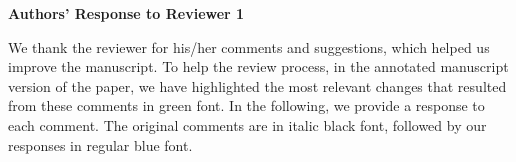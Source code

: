 \documentclass{article}
\begin{document}

\begin{center}
	\bf
	\large
	Authors' Response to Reviewer 1
\end{center}

\noindent
We thank the reviewer for his/her comments and suggestions, which helped us improve the manuscript. To help the review process, in the annotated manuscript version of the paper, we have highlighted the most relevant changes that resulted from these comments in green font. In the following, we provide a response to each comment. The original comments are in italic black font, followed by our responses in regular blue font.
\vspace{2ex}
\newline
\end{document}

